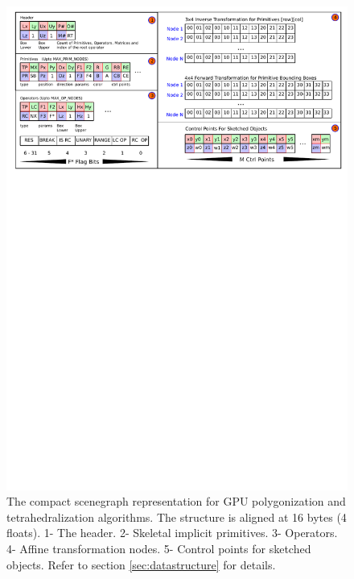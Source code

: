 \begin{figure}[H]
  \centering
  \includegraphics[width=1.0\linewidth]{figures/gpupoly/lineartree.pdf}
  \caption{\label{fig:datastructure}
  {The compact \blob scenegraph representation for GPU polygonization and tetrahedralization algorithms. The structure is 
  aligned at 16 bytes (4 floats). 1- The header. 2- Skeletal implicit primitives. 3- Operators. 4- Affine transformation 
  nodes. 5- Control points for sketched objects. Refer to section \ref{sec:datastructure} for details.}
}
\end{figure}

